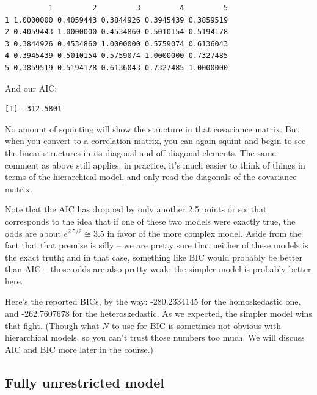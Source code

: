\documentclass[
  letterpaper,
  DIV=11,
  numbers=noendperiod]{scrreprt}
\newenvironment{Shaded}{\begin{snugshade}}{\end{snugshade}}
\newcommand{\FunctionTok}[1]{\textcolor[rgb]{0.02,0.16,0.49}{#1}}
\newcommand{\NormalTok}[1]{\textcolor[rgb]{0.00,0.44,0.13}{#1}}
\newcommand{\SpecialCharTok}[1]{\textcolor[rgb]{0.25,0.44,0.63}{#1}}
\begin{document}
\begin{verbatim}
          1         2         3         4         5
1 1.0000000 0.4059443 0.3844926 0.3945439 0.3859519
2 0.4059443 1.0000000 0.4534860 0.5010154 0.5194178
3 0.3844926 0.4534860 1.0000000 0.5759074 0.6136043
4 0.3945439 0.5010154 0.5759074 1.0000000 0.7327485
5 0.3859519 0.5194178 0.6136043 0.7327485 1.0000000
\end{verbatim}

And our AIC:

\begin{Shaded}
\end{Shaded}

\begin{verbatim}
[1] -312.5801
\end{verbatim}

No amount of squinting will show the structure in that covariance
matrix. But when you convert to a correlation matrix, you can again
squint and begin to see the linear structures in its diagonal and
off-diagonal elements. The same comment as above still applies: in
practice, it's much easier to think of things in terms of the
hierarchical model, and only read the diagonals of the covariance
matrix.

Note that the AIC has dropped by only another 2.5 points or so; that
corresponds to the idea that if one of these two models were exactly
true, the odds are about \(e^{2.5/2}\cong 3.5\) in favor of the more
complex model. Aside from the fact that that premise is silly -- we are
pretty sure that neither of these models is the exact truth; and in that
case, something like BIC would probably be better than AIC -- those odds
are also pretty weak; the simpler model is probably better here.

Here's the reported BICs, by the way: -280.2334145 for the homoskedastic
one, and -262.7607678 for the heteroskedastic. As we expected, the
simpler model wins that fight. (Though what \(N\) to use for BIC is
sometimes not obvious with hierarchical models, so you can't trust those
numbers too much. We will discuss AIC and BIC more later in the course.)

\hypertarget{fully-unrestricted-model}{%
\subsection{Fully unrestricted model}\label{fully-unrestricted-model}}
\end{document}

